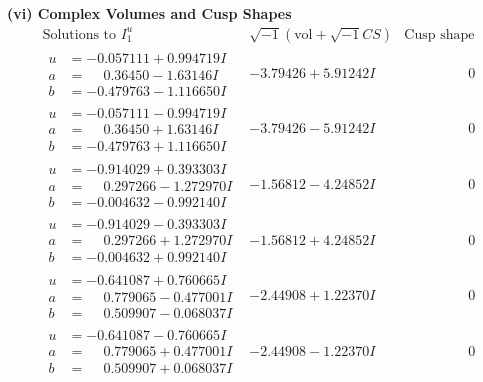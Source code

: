 \documentclass[1p]{elsarticle_modified}
\theoremstyle{definition}
\newcommand{\I}{\sqrt{-1}}
\begin{document}
\newpage\flushleft \textbf{(vi) Complex Volumes and Cusp Shapes}
$$\begin{array}{c|c|c}  
\text{Solutions to }I^u_{1}& \I (\text{vol} + \sqrt{-1}CS) & \text{Cusp shape}\\
 \hline 
\begin{aligned}
u &= -0.057111 + 0.994719 I \\
a &= \phantom{-}0.36450 - 1.63146 I \\
b &= -0.479763 - 1.116650 I\end{aligned}
 & -3.79426 + 5.91242 I & \phantom{-0.000000 } 0 \\ \hline\begin{aligned}
u &= -0.057111 - 0.994719 I \\
a &= \phantom{-}0.36450 + 1.63146 I \\
b &= -0.479763 + 1.116650 I\end{aligned}
 & -3.79426 - 5.91242 I & \phantom{-0.000000 } 0 \\ \hline\begin{aligned}
u &= -0.914029 + 0.393303 I \\
a &= \phantom{-}0.297266 - 1.272970 I \\
b &= -0.004632 - 0.992140 I\end{aligned}
 & -1.56812 - 4.24852 I & \phantom{-0.000000 } 0 \\ \hline\begin{aligned}
u &= -0.914029 - 0.393303 I \\
a &= \phantom{-}0.297266 + 1.272970 I \\
b &= -0.004632 + 0.992140 I\end{aligned}
 & -1.56812 + 4.24852 I & \phantom{-0.000000 } 0 \\ \hline\begin{aligned}
u &= -0.641087 + 0.760665 I \\
a &= \phantom{-}0.779065 - 0.477001 I \\
b &= \phantom{-}0.509907 - 0.068037 I\end{aligned}
 & -2.44908 + 1.22370 I & \phantom{-0.000000 } 0 \\ \hline\begin{aligned}
u &= -0.641087 - 0.760665 I \\
a &= \phantom{-}0.779065 + 0.477001 I \\
b &= \phantom{-}0.509907 + 0.068037 I\end{aligned}
 & -2.44908 - 1.22370 I & \phantom{-0.000000 } 0 \\ \hline\begin{aligned}

\end{aligned}
\end{array}$$
\end{document}
